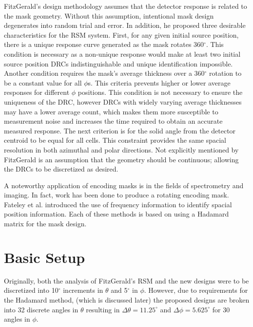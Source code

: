 \documentclass[3p,times]{elsarticle}
\begin{document}
FitzGerald's design methodology assumes that the detector response is related to the mask geometry.  Without this assumption, intentional mask design degenerates into random trial and error.
In addition, he proposed three desirable characteristics for the RSM system.  
First, for any given initial source position, there is a unique response curve generated as the mask rotates 360$^\circ$.  This condition is necessary 
as a non-unique response would make at least two initial source position DRCs indistinguishable and unique identification impossible.
Another condition requires the mask's average thickness over a 360$^\circ$ 
rotation to be a constant value for all $\phi$s.  This criteria prevents higher or lower average responses for different $\phi$ positions.  This condition is not necessary to ensure 
the uniqueness of the DRC, however DRCs with widely varying average thicknesses may have a lower average count, which makes them more susceptible to measurement noise and increases
the time required to obtain an accurate measured response.
The next criterion is for the solid angle from the detector centroid to be equal for all cells.  This constraint provides the same spacial resolution in both azimuthal and polar directions.
Not explicitly mentioned by FitzGerald is an assumption that the geometry should be continuous; allowing the DRCs to be discretized as desired.

A noteworthy application of encoding masks is in the fields of spectrometry and imaging\cite{Sloane76,Finger85,Hanley00,DeVerse00}.  
In fact, work has been done to produce a rotating encoding mask\cite{Bellamy97}.
Fateley et al.\cite{Fateley00} introduced the use of frequency information to identify spacial position information.  Each of these methods is based on using a Hadamard matrix for the mask design.

\section{Basic Setup}
Originally, both the analysis of FitzGerald's RSM and the new designs were to be discretized into 10$^\circ$ increments in $\theta$ and 5$^\circ$ in $\phi$.  
However, due to requirements for the Hadamard method, (which is discussed later) 
the proposed designs are broken into 32 discrete angles in $\theta$ resulting in $\Delta\theta=11.25^\circ$ and $\Delta\phi=5.625^\circ$ for 30 angles in $\phi$.
\end{document}
